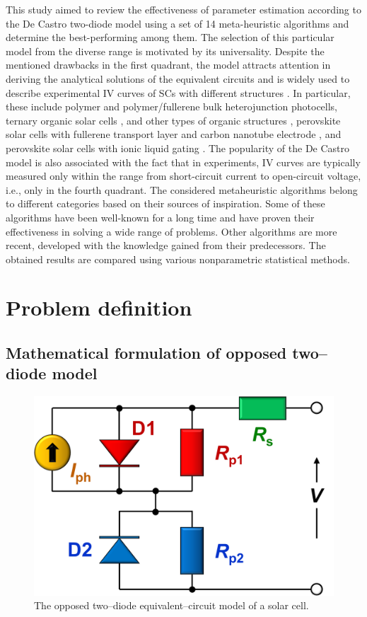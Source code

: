 \documentclass[a4paper,fleqn]{cas-sc}
\begin{document}
This study aimed to review  the effectiveness of parameter estimation according to the De Castro two-diode model \cite{Castro2010}
using a set of 14 meta-heuristic algorithms and determine the best-performing among them.
The selection of this particular model from the diverse range is motivated by its universality.
Despite the mentioned drawbacks in the first quadrant,
the model attracts attention in deriving the analytical solutions of the equivalent circuits \cite{Yu2019a}
and is widely used to describe experimental IV curves of SCs with different structures
\cite{CastroUseBook,Pillai2017,Arredondo2018,delPozo2012,BrenesBadilla2018,Tada2015Organic,Makha2018,CastroUsePerovskitIonikLiquid,CastroUsePerovskitFullerene}.
In particular, these include polymer \cite{Tada2015Organic}
and polymer/fullerene \cite{delPozo2012} bulk heterojunction photocells,
ternary organic solar cells \cite{Makha2018},
and other types of organic structures \cite{Pillai2017,Arredondo2018},
perovskite solar cells with fullerene transport layer and carbon nanotube electrode \cite{CastroUsePerovskitFullerene},
and perovskite solar cells with ionic liquid gating \cite{CastroUsePerovskitIonikLiquid}.
The popularity of the De Castro model is also associated with the fact that in experiments,
IV curves are typically measured only within the range
from short-circuit current to open-circuit voltage, i.e., only in the fourth quadrant.
The considered metaheuristic algorithms belong to different categories based on their sources of inspiration.
Some of these algorithms have been well-known for a long time and have proven their effectiveness in solving a wide range of problems.
Other algorithms are more recent, developed with the knowledge gained from their predecessors.
The obtained results are compared using various nonparametric statistical methods.




\section{Problem definition}\label{MM}
\subsection{Mathematical formulation of opposed two--diode model}\label{SCModel}
\begin{figure}[]
	\centering
		\includegraphics[width=0.35\columnwidth]{Chem}
	  \caption{The opposed two--diode equivalent--circuit model of a solar cell.}\label{fig_chem}
\end{figure}
\end{document}
